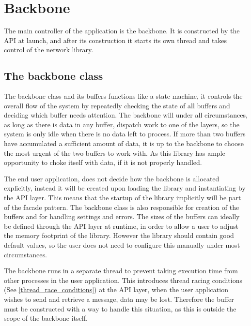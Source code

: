 \chapter{Backbone}\label{chap:backbone}
The main controller of the application is the backbone. It is constructed by the API at launch, and after its construction it starts its own thread and takes control of the network library.

\section{The backbone class}
The backbone class and its buffers functions like a state machine, it controls the overall flow of the system by repeatedly checking the state of all buffers and deciding which buffer needs attention. The backbone will under all circumstances, as long as there is data in any buffer, dispatch work to one of the layers, so the system is only idle when there is no data left to process.
If more than two buffers have accumulated a sufficient amount of data, it is up to the backbone to choose the most urgent of the two buffers to work with. As this library has ample opportunity to choke itself with data, if it is not properly handled.

The end user application, does not decide how the backbone is allocated explicitly, instead it will be created upon loading the library and instantiating by the API layer. This means that the startup of the library implicitly will be part of the facade pattern.
The backbone class is also responsible for creation of the buffers and for handling settings and errors. 
The sizes of the buffers can ideally be defined through the API layer at runtime, in order to allow a user to adjust the memory footprint of the library. 
However the library should contain good default values, so the user does not need to configure this manually under most circumstances.

The backbone runs in a separate thread to prevent taking execution time from other processes in the user application. This introduces thread racing conditions  (See \ref{thread_race_conditions}) at the API layer, when the user application wishes to send and retrieve a message, data may be lost. Therefore the buffer must be constructed with a way to handle this situation, as this is outside the scope of the backbone itself.

